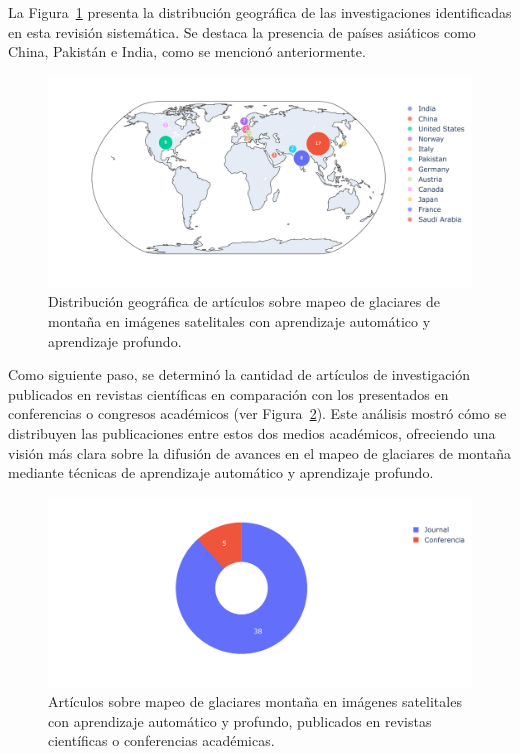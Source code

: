 La Figura~\ref{fig:ArticuloPaisesMapa} presenta la distribución geográfica de las investigaciones identificadas en esta revisión sistemática. Se destaca la presencia de países asiáticos como China, Pakistán e India, como se mencionó anteriormente.

\begin{figure}[H]
    \begin{center}
    \includegraphics[width=1\textwidth]{Images/ArticuloPaisesMapa.pdf}
    \end{center}
    \caption{Distribución geográfica de artículos sobre mapeo de glaciares de montaña en imágenes satelitales con aprendizaje automático y aprendizaje profundo.}
     \label{fig:ArticuloPaisesMapa}
\end{figure}

Como siguiente paso, se determinó la cantidad de artículos de investigación publicados en revistas científicas en comparación con los presentados en conferencias o congresos académicos (ver Figura~\ref{fig:ArticuloTipo}). Este análisis mostró cómo se distribuyen las publicaciones entre estos dos medios académicos, ofreciendo una visión más clara sobre la difusión de avances en el mapeo de glaciares de montaña mediante técnicas de aprendizaje automático y aprendizaje profundo.

\begin{figure}[H]
    \begin{center}
    \includegraphics[width=1\textwidth]{Images/ArticuloTipo.pdf}
    \end{center}
    \caption{Artículos sobre mapeo de glaciares montaña en imágenes satelitales con aprendizaje automático y profundo, publicados en revistas científicas o conferencias académicas.}
     \label{fig:ArticuloTipo}
\end{figure}

